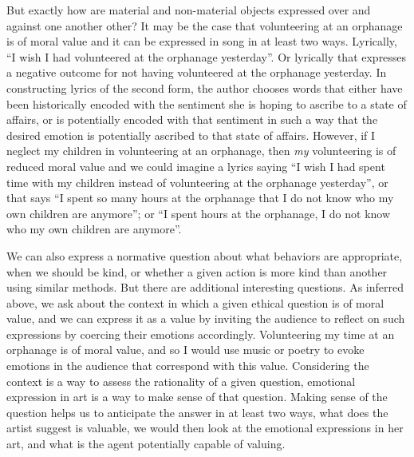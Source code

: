 \documentclass[
  letterpaper,
  DIV=11,
  numbers=noendperiod]{scrreprt}
\begin{document}
\begin{tcolorbox}[enhanced jigsaw, arc=.35mm, breakable, rightrule=.15mm, colback=white, colframe=quarto-callout-important-color-frame, bottomrule=.15mm, leftrule=.75mm, opacityback=0, toprule=.15mm, left=2mm]
\begin{tcolorbox}[enhanced jigsaw, arc=.35mm, breakable, rightrule=.15mm, colback=white, colframe=quarto-callout-tip-color-frame, bottomrule=.15mm, leftrule=.75mm, opacityback=0, toprule=.15mm, left=2mm]
But exactly how are material and non-material objects expressed over and
against one another other? It may be the case that volunteering at an
orphanage is of moral value and it can be expressed in song in at least
two ways. Lyrically, ``I wish I had volunteered at the orphanage
yesterday''. Or lyrically that expresses a negative outcome for not
having volunteered at the orphanage yesterday. In constructing lyrics of
the second form, the author chooses words that either have been
historically encoded with the sentiment she is hoping to ascribe to a
state of affairs, or is potentially encoded with that sentiment in such
a way that the desired emotion is potentially ascribed to that state of
affairs. However, if I neglect my children in volunteering at an
orphanage, then \emph{my} volunteering is of reduced moral value and we
could imagine a lyrics saying ``I wish I had spent time with my children
instead of volunteering at the orphanage yesterday'', or that says ``I
spent so many hours at the orphanage that I do not know who my own
children are anymore''; or ``I spent hours at the orphanage, I do not
know who my own children are anymore''.

We can also express a normative question about what behaviors are
appropriate, when we should be kind, or whether a given action is more
kind than another using similar methods. But there are additional
interesting questions. As inferred above, we ask about the context in
which a given ethical question is of moral value, and we can express it
as a value by inviting the audience to reflect on such expressions by
coercing their emotions accordingly. Volunteering my time at an
orphanage is of moral value, and so I would use music or poetry to evoke
emotions in the audience that correspond with this value. Considering
the context is a way to assess the rationality of a given question,
emotional expression in art is a way to make sense of that question.
Making sense of the question helps us to anticipate the answer in at
least two ways, what does the artist suggest is valuable, we would then
look at the emotional expressions in her art, and what is the agent
potentially capable of valuing.


\end{tcolorbox}
\end{tcolorbox}
\end{document}
